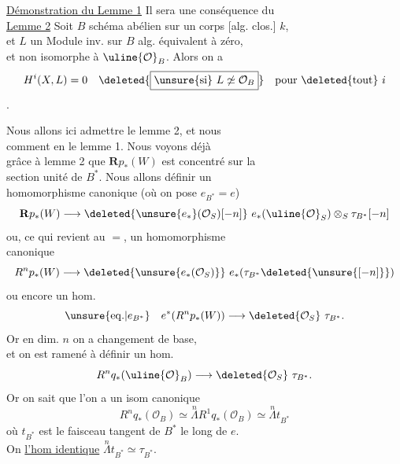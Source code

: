\uline{Démonstration du Lemme 1} Il sera une conséquence du\\
\uline{Lemme 2}  Soit $B$ schéma abélien sur un corps [alg. clos.] $k$,\\
et $L$ un Module inv. sur $B$ alg. équivalent à zéro, \\
et non isomorphe à $\uline{\mathcal O}_B$. Alors on a
\[
H^i(X,L)=0\quad \deleted{\boxed{\unsure{\text{si}}\ L\not\simeq\mathcal O_B}}\quad\text{pour }\deleted{\text{tout}}\ i
\]
.


Nous allons ici admettre le lemme 2, et nous \\
comment en   le lemme 1. Nous voyons déjà\\
grâce à lemme 2 que $\mathbf Rp_*(W)$ est concentré sur la\\
section unité de $B^*$. Nous allons définir un\\
homomorphisme canonique (où on pose $e_{B^*}=e$)
\[
\mathbf Rp_*(W)\longrightarrow\deleted{\unsure{e_*}(\mathcal O_S)[-n]}\ e_*(\uline{\mathcal O}_S)\otimes_S\tau_{B^*}[-n]
\]
ou, ce qui revient au $=$,  un homomorphisme\\
canonique
\[
R^np_*(W)\longrightarrow\deleted{\unsure{e_*(\mathcal O_S)}}\ e_*(\tau_{B^*}\deleted{\unsure{[-n]}})
\]
ou encore un hom.
\[
\unsure{\mathrm{eq.}|e_{B^*}}\quad e^*(R^np_*(W))\longrightarrow\deleted{\mathcal O_S}\ \tau_{B^*}.
\]
Or en dim. $n$ on a  changement de base,\\
et  on est ramené à définir un hom.
\[
R^nq_*(\uline{\mathcal O}_B)\longrightarrow\deleted{\mathcal O_S}\ \tau_{B^*}.
\]
Or on sait que l'on a un isom canonique
\[
R^nq_*(\mathcal O_B)\simeq\overset{n}{\Lambda}R^1q_*(\mathcal O_B)\simeq\overset{n}{\Lambda}t_{B^*}
\]
où $t_{B^*}$ est le faisceau tangent de $B^*$ le long de $e$.\\
On   \uline{l'hom identique} $\overset{n}{\Lambda}t_{B^*}\simeq\tau_{B^*}$.
